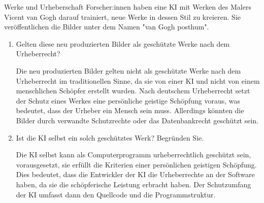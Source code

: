 \documentclass{article}
\begin{document}
\begin{exercise}{Werke und Urheberschaft}
  Forscher:innen haben eine KI mit Werken des Malers Vicent van Gogh darauf trainiert, neue Werke in dessen Stil zu kreieren. Sie veröffentlichen die Bilder unter dem Namen "van Gogh posthum".
  \begin{enumerate}
    \item Gelten diese neu produzierten Bilder als geschützte Werke nach dem Urheberrecht?

          \begin{solution}
            Die neu produzierten Bilder gelten nicht als geschützte Werke nach dem Urheberrecht im traditionellen Sinne, da sie von einer KI und nicht von einem menschlichen Schöpfer erstellt wurden. Nach deutschem Urheberrecht setzt der Schutz eines Werkes eine persönliche geistige Schöpfung voraus, was bedeutet, dass der Urheber ein Mensch sein muss. Allerdings könnten die Bilder durch verwandte Schutzrechte oder das Datenbankrecht geschützt sein.
          \end{solution}
    \item Ist die KI selbst ein solch geschütztes Werk? Begründen Sie.

          \begin{solution}
            Die KI selbst kann als Computerprogramm urheberrechtlich geschützt sein, vorausgesetzt, sie erfüllt die Kriterien einer persönlichen geistigen Schöpfung. Dies bedeutet, dass die Entwickler der KI die Urheberrechte an der Software haben, da sie die schöpferische Leistung erbracht haben. Der Schutzumfang der KI umfasst dann den Quellcode und die Programmstruktur.
          \end{solution}
  \end{enumerate}
\end{exercise}
\end{document}
